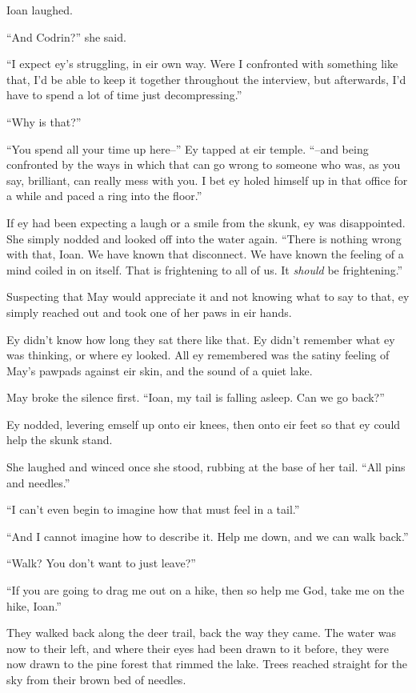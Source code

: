 Ioan laughed.

``And Codrin?'' she said.

``I expect ey's struggling, in eir own way. Were I confronted with something like that, I'd be able to keep it together throughout the interview, but afterwards, I'd have to spend a lot of time just decompressing.''

``Why is that?''

``You spend all your time up here--'' Ey tapped at eir temple. ``--and being confronted by the ways in which that can go wrong to someone who was, as you say, brilliant, can really mess with you. I bet ey holed himself up in that office for a while and paced a ring into the floor.''

If ey had been expecting a laugh or a smile from the skunk, ey was disappointed. She simply nodded and looked off into the water again. ``There is nothing wrong with that, Ioan. We have known that disconnect. We have known the feeling of a mind coiled in on itself. That is frightening to all of us. It \emph{should} be frightening.''

Suspecting that May would appreciate it and not knowing what to say to that, ey simply reached out and took one of her paws in eir hands.

Ey didn't know how long they sat there like that. Ey didn't remember what ey was thinking, or where ey looked. All ey remembered was the satiny feeling of May's pawpads against eir skin, and the sound of a quiet lake.

May broke the silence first. ``Ioan, my tail is falling asleep. Can we go back?''

Ey nodded, levering emself up onto eir knees, then onto eir feet so that ey could help the skunk stand.

She laughed and winced once she stood, rubbing at the base of her tail. ``All pins and needles.''

``I can't even begin to imagine how that must feel in a tail.''

``And I cannot imagine how to describe it. Help me down, and we can walk back.''

``Walk? You don't want to just leave?''

``If you are going to drag me out on a hike, then so help me God, take me on the hike, Ioan.''

They walked back along the deer trail, back the way they came. The water was now to their left, and where their eyes had been drawn to it before, they were now drawn to the pine forest that rimmed the lake. Trees reached straight for the sky from their brown bed of needles.

